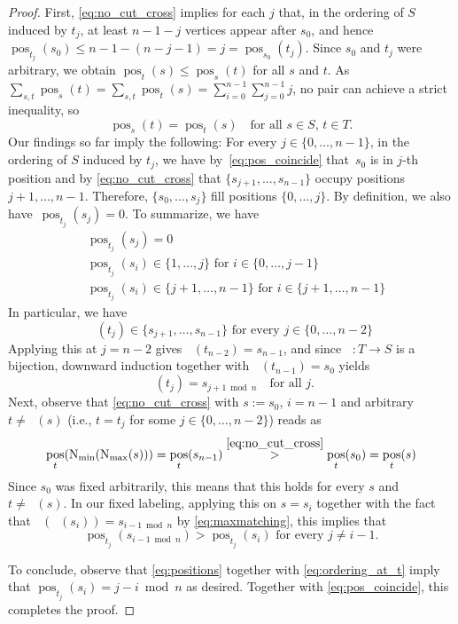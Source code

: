 \documentclass[11pt, letterpaper]{article}
\DeclareMathOperator{\pos}{pos}
\DeclareMathOperator{\minmat}{N_{\mathrm{min}}}
\DeclareMathOperator{\maxmat}{N_{\mathrm{max}}}
\theoremstyle{definition}
\theoremstyle{plain}
\begin{document}
\begin{proof}
First, \eqref{eq:no_cut_cross} implies for each $j$ that, in the ordering of $S$ induced by $t_j$, at least $n-1-j$ vertices appear after $s_0$, and hence $\pos_{t_j}(s_0)\leq n-1 - (n-j-1) =j=\pos_{s_0}(t_j)$.
Since $s_0$ and $t_j$ were arbitrary, we obtain $\pos_t(s)\le\pos_s(t)$ for all $s$ and $t$. 
As $\sum_{s,t}\pos_s(t)=\sum_{s,t}\pos_t(s)=\sum_{i=0}^{n-1}\sum_{j=0}^{n-1} j$, no pair can achieve a strict inequality, so
\begin{equation}\label{eq:pos_coincide}
  \pos_s(t)=\pos_t(s)\quad\text{for all }s\in S,\,t\in T.
\end{equation}
Our findings so far imply the following: For every $j\in\{0,\dots,n-1\}$, in the ordering of $S$ induced by $t_j$, we have by~\eqref{eq:pos_coincide} that~$s_0$ is in $j$-th position and by \eqref{eq:no_cut_cross}  that $\{s_{j+1}, \ldots, s_{n-1}\}$ occupy positions $j+1, \dots, n-1$. 
Therefore, $\{s_0, \ldots, s_j\}$ fill positions $\{0,\ldots, j\}$. By definition, we also have~${\pos_{t_j}(s_j)=0}$. To summarize, we have
\begin{align}
\label{eq:positions}
&\pos_{t_j}(s_j)=0 \nonumber\\ 
&\pos_{t_j}(s_i) \in \{1, \dots, j\} \text{ for } i\in \{0,\dots, j-1\}\\
&\pos_{t_j}(s_i) \in \{j+1, \dots, n-1\} \text{ for } i\in \{j+1,\dots, n-1\}\nonumber
\end{align}
In particular, we have 
\[
\maxmat(t_j)\in\{s_{j+1},\ldots, s_{n-1}\} \text{ for every } j\in \{0,\dots, n-2\}
\]
Applying this at $j=n-2$ gives $\maxmat(t_{n-2})=s_{n-1}$, and since $\maxmat\colon T\to S$ is a bijection, downward induction together with $\maxmat(t_{n-1})=s_0$ yields
\begin{equation}\label{eq:maxmatching}
  \maxmat(t_j)=s_{j+1\bmod n}\quad\text{for all }j.
\end{equation}
Next, observe that \eqref{eq:no_cut_cross} with $s:=s_0$, $i=n-1$ and arbitrary $t\neq  \maxmat(s)$ (i.e., $t=t_j$ for some $j\in\{0,\dots, n-2\}$) reads as
\begin{equation}
\label{eq:no_cut_cross_maxmat}
\pos_t(\minmat(\maxmat(s)))=\pos_t(s_{n-1})
\overset{\eqref{eq:no_cut_cross}}{>}
\pos_t(s_0)=\pos_t(s)
\end{equation}
Since $s_0$ was fixed arbitrarily, this means that this holds for every $s$ and $t\neq \maxmat(s)$.
In our fixed labeling, applying this on $s=s_i$ together with the fact that $\minmat(\maxmat(s_i))=s_{i-1 \bmod n}$ by \eqref{eq:maxmatching}, this implies that
\begin{equation}
\label{eq:ordering_at_t}
\pos_{t_j}(s_{i-1\bmod n})>\pos_{t_j}(s_i) \text{ for every } j\neq i-1.
\end{equation}

To conclude, observe that \eqref{eq:positions} together with \eqref{eq:ordering_at_t} imply that $\pos_{t_j}(s_i)=j-i\bmod n$ as desired. Together with \eqref{eq:pos_coincide}, this completes the proof.
\end{proof}
\end{document}
